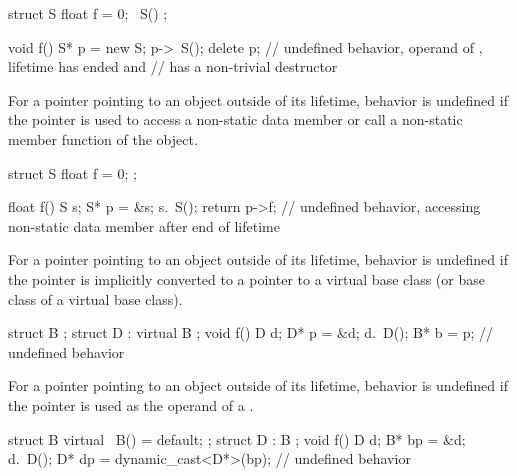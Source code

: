\pnum
\begin{example}
\begin{codeblock}
struct S {
  float f = 0;
  ~S() {}
};

void f() {
  S* p = new S;
  p->~S();
  delete p;     // undefined behavior, operand of , lifetime has ended and 
                // has a non-trivial destructor
}
\end{codeblock}
\end{example}


\pnum
For a pointer pointing to an object outside of its lifetime, behavior is
undefined if the pointer is used to access a non-static data member or call a
non-static member function of the object.

\pnum
\begin{example}
\begin{codeblock}
struct S {
  float f = 0;
};

float f() {
  S s;
  S* p = &s;
  s.~S();
  return p->f;  // undefined behavior, accessing non-static data member after end of lifetime
}
\end{codeblock}
\end{example}


\pnum
For a pointer pointing to an object outside of its lifetime, behavior is
undefined if the pointer is implicitly converted to a pointer
to a virtual base class (or base class of a virtual base class).

\pnum
\begin{example}
\begin{codeblock}
struct B {};
struct D : virtual B {};
void f() {
  D d;
  D* p = &d;
  d.~D();
  B* b = p;     // undefined behavior
}
\end{codeblock}
\end{example}


\pnum
For a pointer pointing to an object outside of its lifetime, behavior is
undefined if the pointer is used as the operand of a
.

\pnum
\begin{example}
\begin{codeblock}
struct B { virtual ~B() = default; };
struct D : B {};
void f()
{
  D d;
  B* bp = &d;
  d.~D();
  D* dp = dynamic_cast<D*>(bp);     // undefined behavior
}
\end{codeblock}
\end{example}

